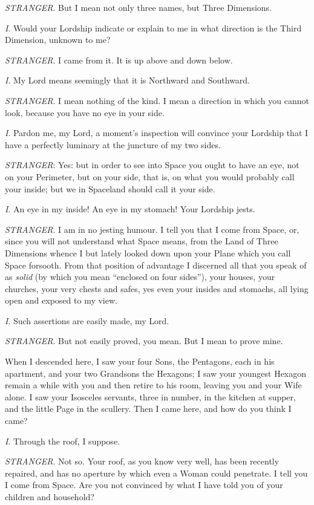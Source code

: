 \documentclass[10pt, kindle, oneside]{kindle}
\begin{document}
\emph{STRANGER}. But I mean not only three names, but Three Dimensions.

\emph{I}. Would your Lordship indicate or explain to me in what direction is the
Third Dimension, unknown to me?

\emph{STRANGER}. I came from it. It is up above and down below.

\emph{I}. My Lord means seemingly that it is Northward and Southward.

\emph{STRANGER}. I mean nothing of the kind. I mean a direction in which you cannot
look, because you have no eye in your side.

\emph{I}. Pardon me, my Lord, a moment's inspection will convince your Lordship that
I have a perfectly luminary at the juncture of my two sides.

\emph{STRANGER}: Yes: but in order to see into Space you ought to have an eye, not on
your Perimeter, but on your side, that is, on what you would probably call
your inside; but we in Spaceland should call it your side.

\emph{I}. An eye in my inside! An eye in my stomach! Your Lordship jests.

\emph{STRANGER}. I am in no jesting humour. I tell you that I come from Space, or,
since you will not understand what Space means, from the Land of Three
Dimensions whence I but lately looked down upon your Plane which you call
Space forsooth. From that position of advantage I discerned all that you speak
of as \emph{solid} (by which you mean ``enclosed on four sides''), your houses, your
churches, your very chests and safes, yes even your insides and stomachs, all
lying open and exposed to my view.

\emph{I}. Such assertions are easily made, my Lord.

\emph{STRANGER}. But not easily proved, you mean. But I mean to prove mine.

When I descended here, I saw your four Sons, the Pentagons, each in his
apartment, and your two Grandsons the Hexagons; I saw your youngest Hexagon
remain a while with you and then retire to his room, leaving you and your Wife
alone. I saw your Isosceles servants, three in number, in the kitchen at
supper, and the little Page in the scullery. Then I came here, and how do you
think I came?

\emph{I}. Through the roof, I suppose.

\emph{STRANGER}. Not so. Your roof, as you know very well, has been recently
repaired, and has no aperture by which even a Woman could penetrate. I tell
you I come from Space. Are you not convinced by what I have told you of your
children and household?
\end{document}
